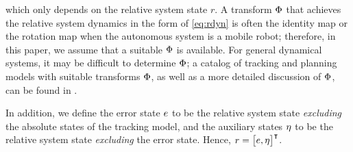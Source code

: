 \noindent which only depends on the relative system state $r$.
A transform $\Phi$ that achieves the relative system dynamics in the form of \eqref{eq:rdyn} is often the identity map or the rotation map when the autonomous system is a mobile robot; therefore, in this paper, we assume that a suitable $\Phi$ is available.
For general dynamical systems, it may be difficult to determine $\Phi$; a catalog of tracking and planning models with suitable transforms $\Phi$, as well as a more detailed discussion of $\Phi$, can be found in \cite{SinghChenEtAl2018}.

In addition, we define the error state $e$ to be the relative system state \textit{excluding} the absolute states of the tracking model, and the auxiliary states $\eta$ to be the relative system state \textit{excluding} the error state.
Hence, $r = \begin{bmatrix} e, \eta \end{bmatrix}^\intercal$.


